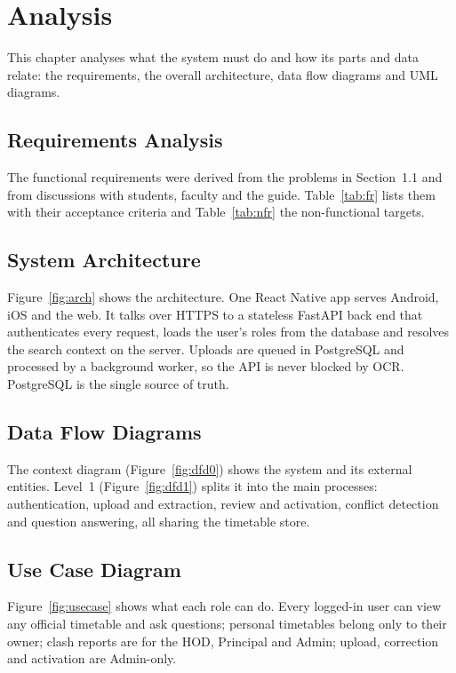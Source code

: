 \section{Analysis}
This chapter analyses what the system must do and how its parts and data relate: the requirements,
the overall architecture, data flow diagrams and UML diagrams.

\subsection{Requirements Analysis}
The functional requirements were derived from the problems in Section~1.1 and from discussions with
students, faculty and the guide. Table~\ref{tab:fr} lists them with their acceptance criteria and
Table~\ref{tab:nfr} the non-functional targets.



\subsection{System Architecture}
Figure~\ref{fig:arch} shows the architecture. One React Native app serves Android, iOS and the web.
It talks over HTTPS to a stateless FastAPI back end that authenticates every request, loads the
user's roles from the database and resolves the search context on the server. Uploads are queued in
PostgreSQL and processed by a background worker, so the API is never blocked by OCR. PostgreSQL is the
single source of truth.


\subsection{Data Flow Diagrams}
The context diagram (Figure~\ref{fig:dfd0}) shows the system and its external entities. Level~1
(Figure~\ref{fig:dfd1}) splits it into the main processes: authentication, upload and extraction,
review and activation, conflict detection and question answering, all sharing the timetable store.



\subsection{Use Case Diagram}
Figure~\ref{fig:usecase} shows what each role can do. Every logged-in user can view any official
timetable and ask questions; personal timetables belong only to their owner; clash reports are for
the HOD, Principal and Admin; upload, correction and activation are Admin-only.


